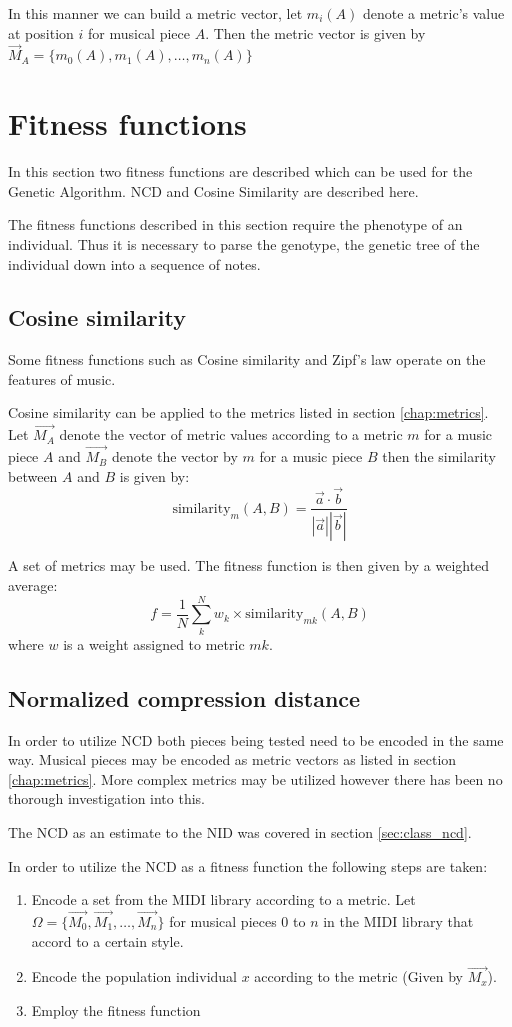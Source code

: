 In this manner we can build a metric vector, let $m_i(A)$ denote a metric's value at position $i$ for musical piece $A$. Then the metric vector is given by $\vec{M}_A = \{m_0(A), m_1(A), \ldots, m_n(A) \}$ 


\section{Fitness functions}

In this section two fitness functions are described which can be used for the Genetic Algorithm. \ac{NCD} and Cosine Similarity are described here.

The fitness functions described in this section require the phenotype of an individual. Thus it is necessary to parse the genotype, the genetic tree of the individual down into a sequence of notes.

\subsection{Cosine similarity}
Some fitness functions such as Cosine similarity and Zipf's law operate on the features of music. 

Cosine similarity can be applied to the metrics listed in section \ref{chap:metrics}. Let $\vec{M_A}$ denote the vector of metric values according to a metric $m$ for a music piece $A$ and $\vec{M_B}$ denote the vector by $m$ for a music piece $B$ then the similarity between $A$ and $B$ is given by:
\[\text{similarity}_m(A,B) = \frac{\vec{a} \cdot \vec{b}}{|\vec{a}| |\vec{b}|}\]

A set of metrics may be used. 
The fitness function is then given by a weighted average:
\[f = \frac{1}{N} \sum_{k}^N w_k \times \text{similarity}_{mk}(A,B) \]
where $w$ is a weight assigned to metric $mk$.

\subsection{Normalized compression distance}
In order to utilize \ac{NCD} both pieces being tested need to be encoded in the same way. Musical pieces may be encoded as metric vectors as listed in section \ref{chap:metrics}. More complex metrics may be utilized however there has been no thorough investigation into this.

The \ac{NCD} as an estimate to the \ac{NID} was covered in section \ref{sec:class_ncd}.

In order to utilize the \ac{NCD} as a fitness function the following steps are taken:
\begin{enumerate}
\item Encode a set from the \ac{MIDI} library according to a metric. Let $\Omega = \{\vec{M_0}, \vec{M_1}, \ldots, \vec{M_n}\}$ for musical pieces $0$ to $n$ in the \ac{MIDI} library that accord to a certain style.
\item Encode the population individual $x$ according to the metric (Given by $\vec{M_x}$).
\item Employ the fitness function
\end{enumerate}

